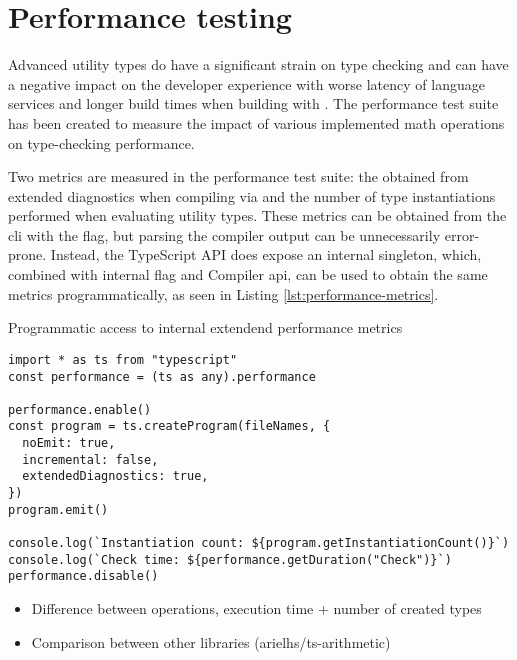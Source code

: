 \section{Performance testing}

Advanced utility types do have a significant strain on type checking and can have a negative impact on the developer experience with worse latency of language services and longer build times when building with . The performance test suite has been created to measure the impact of various implemented math operations on type-checking performance. 

Two metrics are measured in the performance test suite: the  obtained from extended diagnostics when compiling via  and the number of type instantiations performed when evaluating utility types. These metrics can be obtained from the  \acrshort{cli} with the  flag, but parsing the compiler output can be unnecessarily error-prone. Instead, the TypeScript API does expose an internal  singleton, which, combined with internal  flag and Compiler \acrshort{api}, can be used to obtain the same metrics programmatically, as seen in Listing \ref{lst:performance-metrics}.

\begin{listing}[ht]
\caption{Programmatic access to internal extendend performance metrics}\label{lst:performance-metrics}
\begin{verbatim}
import * as ts from "typescript"
const performance = (ts as any).performance

performance.enable()
const program = ts.createProgram(fileNames, {
  noEmit: true,
  incremental: false,
  extendedDiagnostics: true,
})
program.emit()

console.log(`Instantiation count: ${program.getInstantiationCount()}`)
console.log(`Check time: ${performance.getDuration("Check")}`)
performance.disable()
\end{verbatim}
\end{listing}






\begin{itemize}
  \item Difference between operations, execution time + number of created types 
  \item Comparison between other libraries (arielhs/ts-arithmetic)
\end{itemize}

